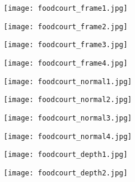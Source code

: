 \documentclass[1p]{elsarticle}
\begin{document}
\begin{figure}[h]
     \centering
     \begin{subfigure}[b]{0.24\textwidth}
         \centering
         \texttt{[image: foodcourt\_frame1.jpg]}
     \end{subfigure}
     \begin{subfigure}[b]{0.24\textwidth}
         \centering
         \texttt{[image: foodcourt\_frame2.jpg]}
     \end{subfigure}
     \begin{subfigure}[b]{0.24\textwidth}
         \centering
         \texttt{[image: foodcourt\_frame3.jpg]}
     \end{subfigure}
     \centering
     \begin{subfigure}[b]{0.24\textwidth}
         \centering
         \texttt{[image: foodcourt\_frame4.jpg]}
     \end{subfigure}
     \begin{subfigure}[b]{0.24\textwidth}
         \centering
         \texttt{[image: foodcourt\_normal1.jpg]}
     \end{subfigure}
     \begin{subfigure}[b]{0.24\textwidth}
         \centering
         \texttt{[image: foodcourt\_normal2.jpg]}
     \end{subfigure}
     \begin{subfigure}[b]{0.24\textwidth}
         \centering
         \texttt{[image: foodcourt\_normal3.jpg]}
     \end{subfigure}
     \begin{subfigure}[b]{0.24\textwidth}
         \centering
         \texttt{[image: foodcourt\_normal4.jpg]}
     \end{subfigure}
     \begin{subfigure}[b]{0.24\textwidth}
         \centering
         \texttt{[image: foodcourt\_depth1.jpg]}
     \end{subfigure}
     \begin{subfigure}[b]{0.24\textwidth}
         \centering
         \texttt{[image: foodcourt\_depth2.jpg]}
     \end{subfigure}

\end{figure}
\end{document}
